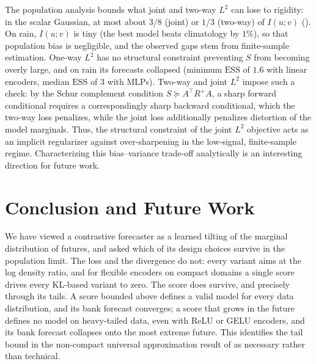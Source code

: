 \documentclass[11pt]{article}
\theoremstyle{plain}
\theoremstyle{definition}
\theoremstyle{remark}
\newcommand{\ESS}{\mathrm{ESS}}
\begin{document}
The population analysis bounds what joint and two-way $L^2$ can lose to
rigidity: in the scalar Gaussian, at most about $3/8$ (joint) or $1/3$
(two-way) of $I(u;v)$ (). On rain, $I(u;v)$ is tiny (the
best model beats climatology by $1\%$), so that population bias is negligible,
and the observed gaps stem from finite-sample estimation. One-way $L^2$ has no
structural constraint preventing $S$ from becoming overly large, and on rain its
forecasts collapsed (minimum $\ESS$ of $1.6$ with linear encoders, median
$\ESS$ of $3$ with MLPs). Two-way and joint $L^2$ impose such a check: by the
Schur complement condition $S\succeq A^{\top}R^{+}A$, a sharp forward
conditional requires a correspondingly sharp backward conditional, which the
two-way loss penalizes, while the joint loss additionally penalizes distortion
of the model marginals. Thus, the structural constraint of the joint $L^2$
objective acts as an implicit regularizer against over-sharpening in the
low-signal, finite-sample regime. Characterizing this bias--variance trade-off
analytically is an interesting direction for future work.

\section{Conclusion and Future Work}
\label{sec:conclusion}

We have viewed a contrastive forecaster as a learned tilting of the marginal
distribution of futures, and asked which of its design choices survive in the
population limit. The loss and the divergence do not: every variant aims at
the log density ratio, and for flexible encoders on compact domains a single
score drives every KL-based variant to zero. The score does survive, and
precisely through its tails. A score bounded above defines a valid model for
every data distribution, and its bank forecast converges; a score that grows
in the future defines no model on heavy-tailed data, even with ReLU or GELU
encoders, and its bank forecast collapses onto the most extreme future. This
identifies the tail bound in the non-compact universal approximation result of
\cite{stuart2026expressivity} as necessary rather than technical.
\end{document}
